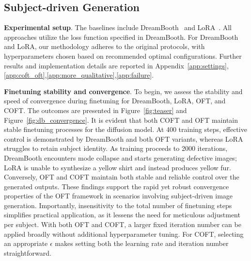 \subsection{Subject-driven Generation}

\textbf{Experimental setup}. The baselines include DreamBooth~\cite{ruiz2023dreambooth} and LoRA~\cite{hulora2022}. All approaches utilize the loss function specified in DreamBooth. For DreamBooth and LoRA, our methodology adheres to the original protocols, with hyperparameters chosen based on recommended optimal configurations. Further results and implementation details are reported in Appendix~\ref{app:settings},\ref{app:coft_oft},\ref{app:more_qualitative},\ref{app:failure}.

\textbf{Finetuning stability and convergence}. To begin, we assess the stability and speed of convergence during finetuning for DreamBooth, LoRA, OFT, and COFT. The outcomes are presented in Figure~\ref{fig:teaser} and Figure~\ref{fig:db_convergence}. It is evident that both COFT and OFT maintain stable finetuning processes for the diffusion model. At 400 training steps, effective control is demonstrated by DreamBooth and both OFT variants, whereas LoRA struggles to retain subject identity. As training proceeds to 2000 iterations, DreamBooth encounters mode collapse and starts generating defective images; LoRA is unable to synthesize a yellow shirt and instead produces yellow fur. Conversely, OFT and COFT maintain both stable and reliable control over the generated outputs. These findings support the rapid yet robust convergence properties of the OFT framework in scenarios involving subject-driven image generation. Importantly, insensitivity to the total number of finetuning steps simplifies practical application, as it lessens the need for meticulous adjustment per subject. With both OFT and COFT, a larger fixed iteration number can be applied broadly without additional hyperparameter tuning. For COFT, selecting an appropriate $\epsilon$ makes setting both the learning rate and iteration number straightforward.

